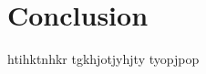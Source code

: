 \chapter{Conclusion}
\label{chap:conclusion}
htihktnhkr\cite{12008} \cite{22009}  \cite{32006} \cite{42005} \cite{52007} \cite{62007} 
tgkhjotjyhjty
tyopjpop
